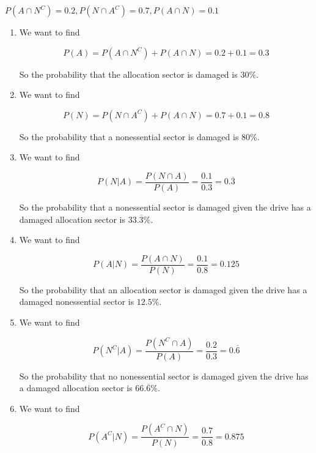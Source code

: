 \documentclass[12pt,letterpaper]{article}
\begin{document}
\begin{enumerate}
\begin{enumerate}
          $P\left(A \cap N^C\right) = 0.2, P\left(N \cap A^C\right) = 0.7, P\left(A \cap N\right) = 0.1$
          \begin{enumerate}[label=(\arabic*)]
            \item
              We want to find

              \[
                P\left(A\right) = P\left(A \cap N^C\right) + P\left(A \cap N\right) = 0.2 + 0.1 = 0.3
              \]

              So the probability that the allocation sector is damaged is $30\%$.
            \item
              We want to find

              \[
                P\left(N\right) = P\left(N \cap A^C\right) + P\left(A \cap N\right) = 0.7 + 0.1 = 0.8
              \]

              So the probability that a nonessential sector is damaged is $80\%$.
            \item
              We want to find

              \[
                P\left(N | A\right) = \frac{P\left(N \cap A\right)}{P\left(A\right)} = \frac{0.1}{0.3} = 0.\overline{3}
              \]

              So the probability that a nonessential sector is damaged given the drive has a damaged allocation sector is $33.\overline{3}\%$.
            \item
              We want to find

              \[
                P\left(A | N\right) = \frac{P\left(A \cap N\right)}{P\left(N\right)} = \frac{0.1}{0.8} = 0.125
              \]

              So the probability that an allocation sector is damaged given the drive has a damaged nonessential sector is $12.5\%$.
            \item
              We want to find

              \[
                P\left(N^C | A\right) = \frac{P\left(N^C \cap A\right)}{P\left(A\right)} = \frac{0.2}{0.3} = 0.\overline{6}
              \]

              So the probability that no nonessential sector is damaged given the drive has a damaged allocation sector is $66.\overline{6}\%$.
            \item
              We want to find

              \[
                P\left(A^C | N\right) = \frac{P\left(A^C \cap N\right)}{P\left(N\right)} = \frac{0.7}{0.8} = 0.875
              \]


\end{enumerate}
\end{enumerate}
\end{enumerate}
\end{document}

